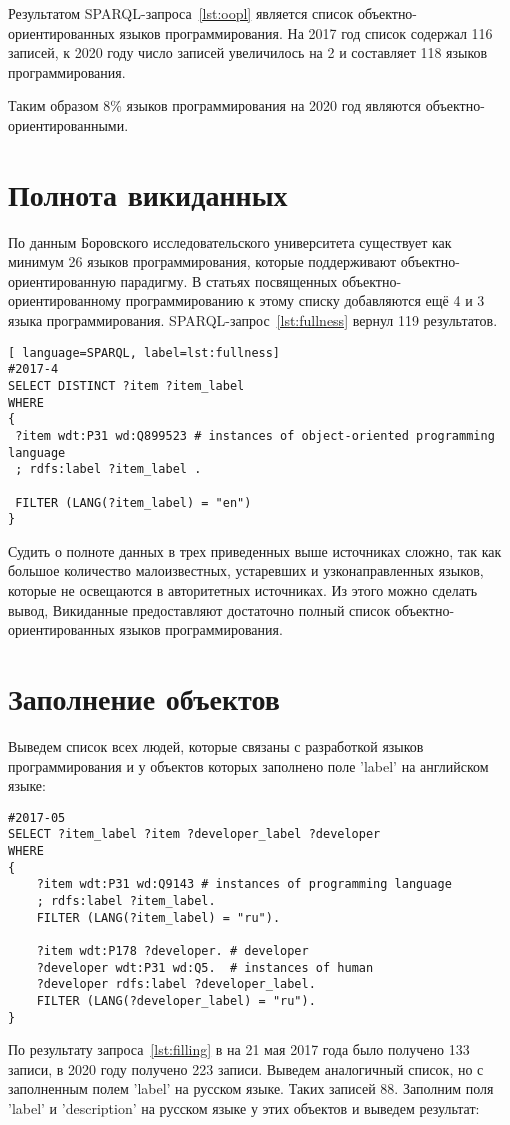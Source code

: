 Результатом SPARQL-запроса~\ref{lst:oopl} является список объектно-ориентированных языков программирования. На 2017 год список содержал 116 записей, к 2020 году число записей увеличилось на 2 и составляет 118 языков программирования.

Таким образом 8\% языков программирования на 2020 год являются объектно-ориентированными.

\section{Полнота викиданных}
По данным Боровского исследовательского университета существует как минимум 26 языков программирования, которые поддерживают объектно-ориентированную парадигму. В статьях посвященных объектно-ориентированному программированию к этому списку добавляются ещё 4 и 3 языка программирования. SPARQL-запрос~\ref{lst:fullness} вернул 119 результатов.

\begin{lstlisting}[ language=SPARQL, label=lst:fullness]
#2017-4
SELECT DISTINCT ?item ?item_label
WHERE
{
 ?item wdt:P31 wd:Q899523 # instances of object-oriented programming language
 ; rdfs:label ?item_label . 

 FILTER (LANG(?item_label) = "en")
}
\end{lstlisting}
Судить о полноте данных в трех приведенных выше источниках сложно, так как большое количество малоизвестных, устаревших и узконаправленных языков, которые не освещаются в авторитетных источниках. Из этого можно сделать вывод, Викиданные предоставляют достаточно полный список объектно-ориентированных языков программирования.

\section{Заполнение объектов}
Выведем список всех людей, которые связаны с разработкой языков программирования и у объектов которых заполнено поле 'label' на английском языке:

\begin{lstlisting}[language=SPARQL, label=lst:filling]
#2017-05
SELECT ?item_label ?item ?developer_label ?developer
WHERE
{
    ?item wdt:P31 wd:Q9143 # instances of programming language
    ; rdfs:label ?item_label. 
    FILTER (LANG(?item_label) = "ru"). 

    ?item wdt:P178 ?developer. # developer 
    ?developer wdt:P31 wd:Q5.  # instances of human
    ?developer rdfs:label ?developer_label. 
    FILTER (LANG(?developer_label) = "ru").  
}
\end{lstlisting}
По результату запроса~\ref{lst:filling} в на 21 мая 2017 года было получено 133 записи, в 2020 году получено 223 записи.  Выведем аналогичный список, но с заполненным полем 'label' на русском языке. Таких записей 88. Заполним поля 'label' и 'description' на русском языке у этих объектов и выведем результат:

